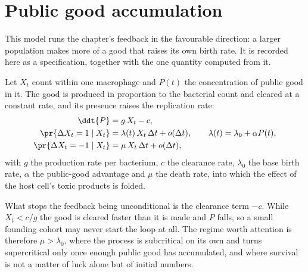 
\section{Public good accumulation}
\label{var:app:publicgood}

This model runs the chapter's feedback in the favourable direction: a larger
population makes more of a good that raises its own birth rate. It is
recorded here as a specification, together with the one quantity computed
from it.

Let $X_t$ count \yp{} within one macrophage and $P(t)$ the concentration of
public good in it. The good is produced in proportion to the bacterial count
and cleared at a constant rate, and its presence raises the replication rate:
\begin{align}
\ddt{P}&=g\,X_t-c,\notag\\
\pr{\Delta X_t=1\mid X_t}&=\lambda(t)\,X_t\,\Delta t+o(\Delta t),
\qquad
\lambda(t)=\lambda_0+\alpha P(t),
\label{var:eq:publicgood}\\
\pr{\Delta X_t=-1\mid X_t}&=\mu\,X_t\,\Delta t+o(\Delta t),\notag
\end{align}
with $g$ the production rate per bacterium, $c$ the clearance rate,
$\lambda_0$ the base birth rate, $\alpha$ the public-good advantage and $\mu$
the death rate, into which the effect of the host cell's toxic products is
folded.

What stops the feedback being unconditional is the clearance term $-c$. While
$X_t<c/g$ the good is cleared faster than it is made and $P$ falls, so a
small founding cohort may never start the loop at all. The regime worth
attention is therefore $\mu>\lambda_0$, where the process is subcritical on
its own and turns supercritical only once enough public good has accumulated,
and where survival is not a matter of luck alone but of initial numbers.

